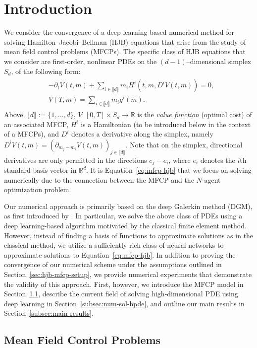 \documentclass[11pt,reqno]{amsart}
\numberwithin{equation}{section}
\theoremstyle{plain}
\newcommand{\R}{\mathbb{R}}
\newcommand{\lbrs}[1]{\llbracket #1 \rrbracket}
\begin{document}
\section{Introduction}
We consider the convergence of a deep learning-based numerical method for solving Hamilton--Jacobi--Bellman (HJB) equations that arise from the study of mean field control problems (MFCPs). The specific class of HJB equations that we consider are first-order, nonlinear PDEs on the $(d-1)$--dimensional simplex $S_d$, of the following form:
\begin{align}
\label{eq:mfcp-hjb}
\begin{split}
    &-\partial_t V(t, m) + \sum_{i \in \lbrs{d}} m_i H^i(t, m, D^i V(t,m)) = 0,\\
    &V(T, m) = \sum_{i \in \lbrs{d}} m_i g^i(m).
\end{split}
\end{align}
Above, $\lbrs{d} := \{1, \ldots, d\}$, $V : [0,T] \times S_d \to \R$ is the {\it value function} (optimal cost) of an associated MFCP, $H^i$ is a Hamiltonian (to be introduced below in the context of a MFCPs), and $D^i$ denotes a derivative along the simplex, namely  $D^i V(t,m)=(\partial_{m_j - m_i} V(t,m))_{j \in \lbrs{d}}$. Note that on the simplex, directional derivatives are only permitted in the directions $e_j - e_i$, where $e_i$ denotes the $i$th standard basis vector in $\R^d$. It is Equation~\eqref{eq:mfcp-hjb} that we focus on solving numerically due to the connection between the MFCP and the $N$-agent optimization problem. 

Our numerical approach is primarily based on the deep Galerkin method (DGM), as first introduced by \cite{dgm}. In particular, we solve the above class of PDEs using a deep learning-based algorithm motivated by the classical finite element method. However, instead of finding a basis of functions to approximate solutions as in the classical method, we utilize a sufficiently rich class of neural networks to approximate solutions to Equation~\eqref{eq:mfcp-hjb}. In addition to proving the convergence of our numerical scheme under the assumptions outlined in Section~\ref{sec:hjb-mfcp-setup}, we provide numerical experiments that demonstrate the validity of this approach. First, however, we introduce the MFCP model in Section~\ref{subsec:mfcp}, describe the current field of solving high-dimensional PDE using deep learning in Section~\ref{subsec:num-sol-hpde}, and outline our main results in Section~\ref{subsec:main-results}.

\subsection{Mean Field Control Problems}
\label{subsec:mfcp}
\end{document}

